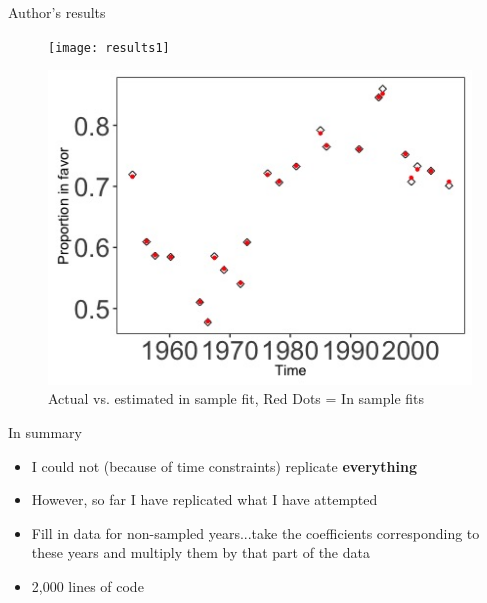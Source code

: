 \documentclass{beamer}
\begin{document}
	\begin{frame}{Author's results}
		\begin{figure}
			\texttt{[image: results1]}
		\end{figure}
		\begin{figure}
			\includegraphics[scale=.3]{myresults}
			\caption{Actual vs. estimated in sample fit, Red Dots = In sample fits}
		\end{figure}
	\end{frame}
	
	\begin{frame}{In summary}
		\begin{itemize}
			\item I could not (because of time constraints) replicate \textbf{everything}
			\item However, so far I have replicated what I have attempted
			\item Fill in data for non-sampled years...take the coefficients corresponding to these years and multiply them by that part of the data
			\item 2,000 lines of code
		\end{itemize}
	\end{frame}
	
\end{document}
